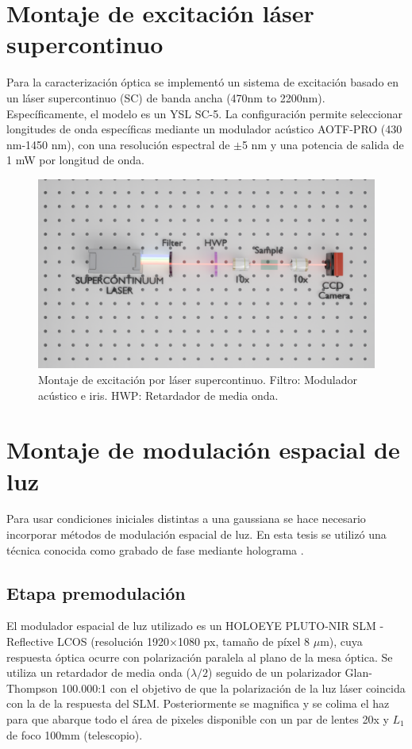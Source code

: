 \section{Montaje de excitación láser supercontinuo}

Para la caracterización óptica se implementó un sistema de excitación basado en un láser supercontinuo (SC) de banda ancha (470nm to 2200nm). Específicamente, el modelo es un YSL SC-5. La configuración permite seleccionar longitudes de onda específicas mediante un modulador acústico AOTF-PRO (430 nm-1450 nm), con una resolución espectral de $\pm$5 nm y una potencia de salida de 1 mW por longitud de onda.

\begin{figure}[H]
    \centering
    \includegraphics[width=\linewidth, trim={5cm 9cm 3cm 7cm},clip]{media/SC_setup}
    \caption{Montaje de excitación por láser supercontinuo. Filtro: Modulador acústico e iris. HWP: Retardador de media onda.}
\end{figure}

\section{Montaje de modulación espacial de luz}

Para usar condiciones iniciales distintas a una gaussiana se hace necesario incorporar métodos de modulación espacial de luz. En esta tesis se utilizó una técnica conocida como grabado de fase mediante holograma \citep{terhalle}.

\subsection{Etapa premodulación}
El modulador espacial de luz utilizado es un HOLOEYE PLUTO-NIR SLM - Reflective LCOS (resolución 1920$\times$1080 px, tamaño de píxel 8 $\mu$m), cuya respuesta óptica ocurre con polarización paralela al plano de la mesa óptica. Se utiliza un retardador de media onda ($\lambda/2$) seguido de un polarizador Glan-Thompson 100.000:1 con el objetivo de que la polarización de la luz láser coincida con la de la respuesta del SLM. Posteriormente se magnifica y se colima el haz para que abarque todo el área de pixeles disponible con un par de lentes 20x y $L_1$ de foco 100mm (telescopio).

